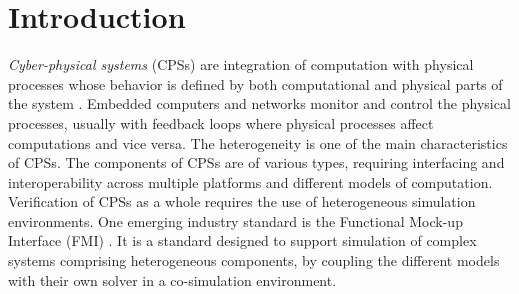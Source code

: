\section{Introduction}

\textit{Cyber-physical systems} (CPSs)  are integration of computation with physical processes whose behavior is defined by both computational and physical parts of the system \cite{Zanero17}. Embedded computers and networks monitor and control the physical processes, usually with feedback loops where physical processes affect computations and vice versa. The heterogeneity is one of the main characteristics of CPSs. The components of CPSs are of various types, requiring interfacing and interoperability across multiple platforms and different models of computation. Verification of CPSs as a whole requires the use of heterogeneous simulation environments. One emerging industry
standard is the Functional Mock-up Interface (FMI) \cite{Blochwitz2011The}. It
is a standard designed to support simulation of complex systems
comprising heterogeneous components, by coupling the different models with their own solver in a co-simulation environment.

